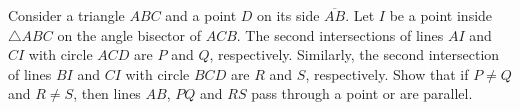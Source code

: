 Consider a triangle $ABC$ and a point $D$ on its side $\overline{AB}$. Let $I$ be a point inside $\triangle ABC$ on the angle bisector of $ACB$. The second intersections of lines $AI$ and $CI$ with circle $ACD$ are $P$ and $Q$, respectively. Similarly, the second intersection of lines $BI$ and $CI$ with circle $BCD$ are $R$ and $S$, respectively. Show that if $P\neq Q$ and $R\neq S$, then lines $AB$, $PQ$ and $RS$ pass through a point or are parallel.